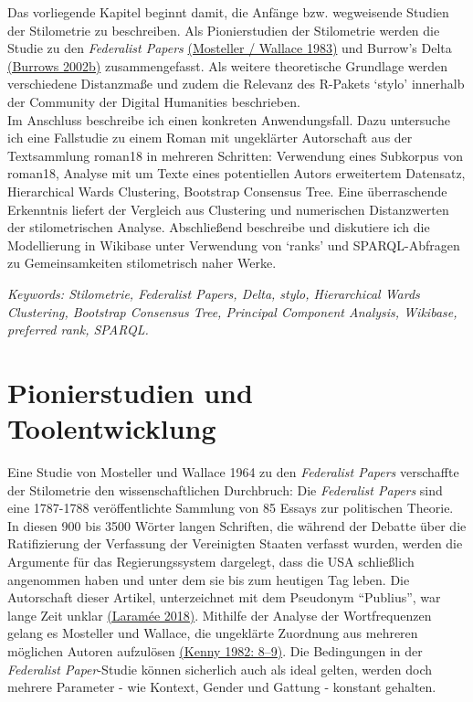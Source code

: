 \documentclass[
  letterpaper,
  DIV=11,
  numbers=noendperiod]{scrreprt}
\begin{document}
Das vorliegende Kapitel beginnt damit, die Anfänge bzw. wegweisende
Studien der Stilometrie zu beschreiben. Als Pionierstudien der
Stilometrie werden die Studie zu den \emph{Federalist Papers}
\href{https://www.zotero.org/google-docs/?XNe5yZ}{(Mosteller / Wallace
1983)} und Burrow's Delta
\href{https://www.zotero.org/google-docs/?DQ9bVV}{(Burrows 2002b)}
zusammengefasst. Als weitere theoretische Grundlage werden verschiedene
Distanzmaße und zudem die Relevanz des R-Pakets `stylo' innerhalb der
Community der Digital Humanities beschrieben.\\
Im Anschluss beschreibe ich einen konkreten Anwendungsfall. Dazu
untersuche ich eine Fallstudie zu einem Roman mit ungeklärter
Autorschaft aus der Textsammlung roman18 in mehreren Schritten:
Verwendung eines Subkorpus von roman18, Analyse mit um Texte eines
potentiellen Autors erweitertem Datensatz, Hierarchical Wards
Clustering, Bootstrap Consensus Tree. Eine überraschende Erkenntnis
liefert der Vergleich aus Clustering und numerischen Distanzwerten der
stilometrischen Analyse. Abschließend beschreibe und diskutiere ich die
Modellierung in Wikibase unter Verwendung von `ranks' und
SPARQL-Abfragen zu Gemeinsamkeiten stilometrisch naher Werke.

\emph{Keywords: Stilometrie, Federalist Papers, Delta, stylo,
Hierarchical Wards Clustering, Bootstrap Consensus Tree, Principal
Component Analysis, Wikibase, preferred rank, SPARQL.}

\section{Pionierstudien und
Toolentwicklung}\label{pionierstudien-und-toolentwicklung}

Eine Studie von Mosteller und Wallace 1964 zu den \emph{Federalist
Papers} verschaffte der Stilometrie den wissenschaftlichen Durchbruch:
Die \emph{Federalist Papers} sind eine 1787-1788 veröffentlichte
Sammlung von 85 Essays zur politischen Theorie. In diesen 900 bis 3500
Wörter langen Schriften, die während der Debatte über die Ratifizierung
der Verfassung der Vereinigten Staaten verfasst wurden, werden die
Argumente für das Regierungssystem dargelegt, dass die USA schließlich
angenommen haben und unter dem sie bis zum heutigen Tag leben. Die
Autorschaft dieser Artikel, unterzeichnet mit dem Pseudonym ``Publius'',
war lange Zeit unklar
\href{https://www.zotero.org/google-docs/?SEaPc6}{(Laramée 2018)}.
Mithilfe der Analyse der Wortfrequenzen gelang es Mosteller und Wallace,
die ungeklärte Zuordnung aus mehreren möglichen Autoren aufzulösen
\href{https://www.zotero.org/google-docs/?wNAfTv}{(Kenny 1982: 8--9)}.
Die Bedingungen in der \emph{Federalist Paper}-Studie können sicherlich
auch als ideal gelten, werden doch mehrere Parameter - wie Kontext,
Gender und Gattung - konstant gehalten.
\end{document}
